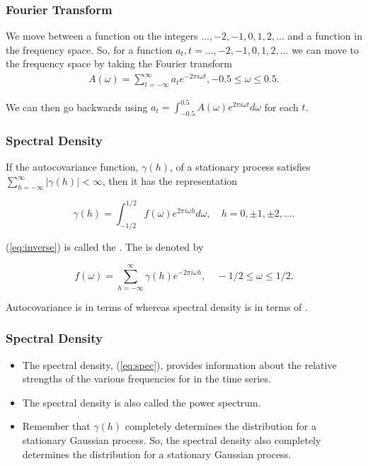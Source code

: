 \documentclass[%
xcolor=pdftex]{beamer}
\begin{document}
\begin{frame}
\frametitle{Fourier Transform}


We move between a function on the integers $...,-2,-1,0,1,2,...$ and a function in the frequency space. So, for
a function $a_t, t=...,-2,-1,0,1,2,...$ we can move to the
frequency space by taking the Fourier transform
\begin{eqnarray*}
A(\omega) = \sum_{t=-\infty}^{\infty} a_t e^{-2 \pi i \omega t}, -0.5\leq \omega \leq 0.5.
\end{eqnarray*}

We can then go backwards using $a_t=\int_{-0.5}^{0.5} A(\omega) e^{2
\pi i \omega t} d\omega$ for each $t$.

\end{frame}

\begin{frame}
\frametitle{Spectral Density}

If the autocovariance function, $\gamma(h)$, of a stationary process satisfies $\sum_{h=-\infty}^{\infty}  |\gamma(h)| < \infty$, then it has the representation

\begin{equation} \label{eq:inverse}
\gamma(h) = \int^{1/2}_{-1/2} f(\omega) e^{2\pi i\omega h} d\omega, \quad h=0,\pm 1,\pm 2,\ldots.
\end{equation}

(\ref{eq:inverse}) is called the \underline{\hspace{70 mm}}. The \underline{\hspace{25 mm}} is denoted by

\begin{equation} \label{eq:spec}
f(\omega)  = \sum^\infty_{h=-\infty} \gamma(h) e^{-2\pi i\omega h}, \quad -1/2 \leq \omega \leq 1/2.
\end{equation}

Autocovariance is in terms of \underline{\hspace{8 mm}} whereas spectral density is in terms of \underline{\hspace{10 mm}}.


\end{frame}


\begin{frame}
\frametitle{Spectral Density}

\begin{itemize}
\item The spectral density, (\ref{eq:spec}), provides information about the relative strengths of the various frequencies for \underline{\hspace{18 mm}} \underline{\hspace{25 mm}} in the time series.
\item The spectral density is also called the power spectrum.  
\item Remember
that $\gamma(h)$ completely determines the distribution for a
stationary Gaussian process.  So, the spectral density also
completely determines the distribution for a
stationary Gaussian process.
\end{itemize}

\end{frame}
\end{document}
